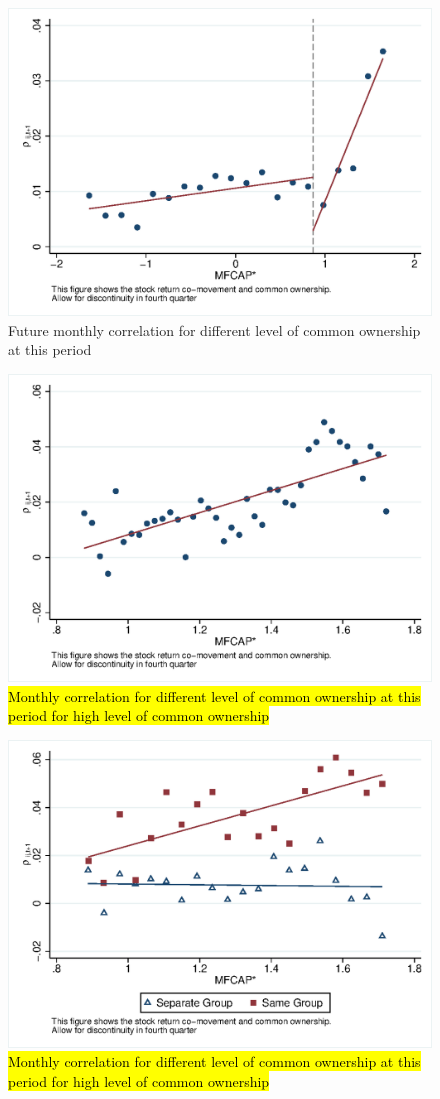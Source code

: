 			\begin{figure}[htbp]
				\centering  
				\includegraphics[width=0.6\linewidth]{"Output/Qmcorr5lrd.eps"}
				\caption{Future monthly correlation for different level of common ownership at this period}
				\label{Qmcorr5lrd}
			\end{figure}
						\begin{figure}[htbp]
							\centering 
							\includegraphics[width=0.6\linewidth]{"Output/Qmcorr5subsample.eps"}
							\caption{\hl{Monthly correlation for different level of common ownership at this period for high level of common ownership}}
							\label{Qmcorr5subsample}
						\end{figure}
			\begin{figure}[htbp]
				\centering  
				\includegraphics[width=0.6\linewidth]{"Output/Qmcorr5lrdbgsubsample.eps"}
				\caption{\hl{Monthly correlation for different level of common ownership at this period for high level of common ownership}}
				\label{Qmcorr5subsamplebg}
			\end{figure}
			
